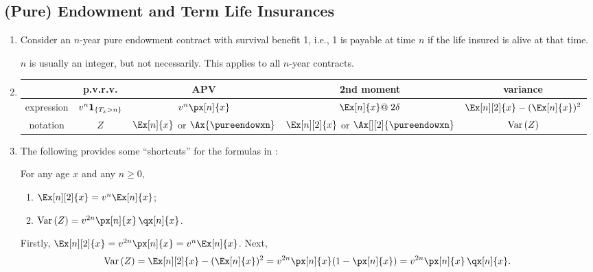 \subsection{(Pure) Endowment and Term Life Insurances}
\label{subsect:pe-tl}
\begin{enumerate}
\item Consider an \(n\)-year pure endowment contract with survival benefit 1,
i.e., 1 is payable at time \(n\) if the life insured is alive at that time.

\begin{note}
\(n\) is usually an integer, but not necessarily. This applies to all
\(n\)-year contracts.
\end{note}

\item \label{it:pure-endow-fmlas}
\begin{tabular}{ccccc}
\toprule
&p.v.r.v.&APV&2nd moment&variance\\
\midrule
expression&\(v^{n}\mathbf{1}_{\left\{T_x>n\right\}}\)&\(v^n\px[n]{x}\)
&\(\Ex[n]{x}@\;2\delta\)&\(\Ex[n][2]{x}-(\Ex[n]{x})^2\)\\
notation&\(Z\)&\(\Ex[n]{x}\) or \(\Ax{\pureendowxn}\)
&\(\Ex[n][2]{x}\) or \(\Ax[][2]{\pureendowxn}\)
&\(\operatorname{Var}\qty(Z)\)\\
\bottomrule
\end{tabular}

\item The following provides some ``shortcuts'' for the formulas in
:
\begin{proposition}
\label{prp:pure-endow-shortcut}
For any age \(x\) and any \(n\ge 0\),
\begin{enumerate}
\item \(\Ex[n][2]{x}=v^n\Ex[n]{x}\);
\item \(\vari{Z}=v^{2n}\px[n]{x}\,\qx[n]{x}\).
\end{enumerate}
\end{proposition}
\begin{pf}
Firstly, \(\Ex[n][2]{x}=v^{2n}\px[n]{x}=v^n\Ex[n]{x}\). Next,
\[\vari{Z}=\Ex[n][2]{x}-(\Ex[n]{x})^2=v^{2n}\px[n]{x}(1-\px[n]{x})
=v^{2n}\px[n]{x}\,\qx[n]{x}.\]
\end{pf}

\end{enumerate}
